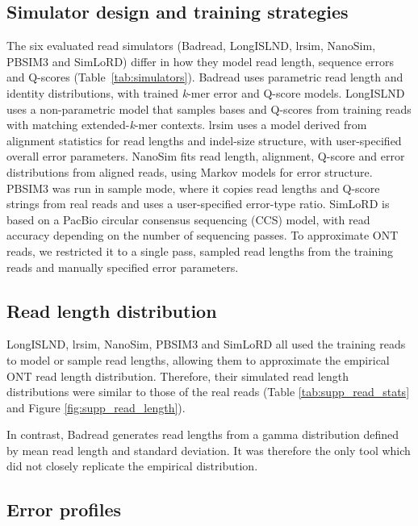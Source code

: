 \documentclass[webpdf,modern,large]{biorxiv}
\begin{document}
\subsection{Simulator design and training strategies}

The six evaluated read simulators (Badread, LongISLND, lrsim, NanoSim, PBSIM3 and SimLoRD) differ in how they model read length, sequence errors and Q-scores (Table~\ref{tab:simulators})\cite{wick2019badread, lau2016longislnd, lrsim, yang2017nanosim, ono2022pbsim3, stocker2016simlord}. Badread uses parametric read length and identity distributions, with trained \textit{k}-mer error and Q-score models. LongISLND uses a non-parametric model that samples bases and Q-scores from training reads with matching extended-\textit{k}-mer contexts. lrsim uses a model derived from alignment statistics for read lengths and indel-size structure, with user-specified overall error parameters. NanoSim fits read length, alignment, Q-score and error distributions from aligned reads, using Markov models for error structure. PBSIM3 was run in sample mode, where it copies read lengths and Q-score strings from real reads and uses a user-specified error-type ratio. SimLoRD is based on a PacBio circular consensus sequencing (CCS) model, with read accuracy depending on the number of sequencing passes. To approximate ONT reads, we restricted it to a single pass, sampled read lengths from the training reads and manually specified error parameters.


\subsection{Read length distribution}

LongISLND, lrsim, NanoSim, PBSIM3 and SimLoRD all used the training reads to model or sample read lengths, allowing them to approximate the empirical ONT read length distribution. Therefore, their simulated read length distributions were similar to those of the real reads (Table \ref{tab:supp_read_stats} and Figure \ref{fig:supp_read_length}).

In contrast, Badread generates read lengths from a gamma distribution defined by mean read length and standard deviation. It was therefore the only tool which did not closely replicate the empirical distribution.


\subsection{Error profiles}
\end{document}
